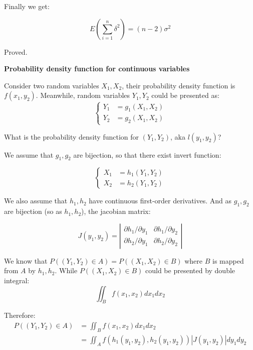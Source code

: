 \documentclass{article}
\begin{document}
Finally we get:

\begin{equation}
E(\sum_{i=1}^n\delta^2)=(n-2)\sigma^2
\end{equation}

Proved.

\textbf{Probability density function for continuous variables}

Consider two random variables \(X_1, X_2\), their probability density function is \(f(x_1, y_2)\).
Meanwhile, random variables \(Y_1, Y_2\) could be presented as:
\begin{equation} 
\left\{
\begin{split}
Y_1&=g_1(X_1, X_2)\\
Y_2&=g_2(X_1, X_2)
\end{split}
\right.
\end{equation}

What is the probability density function for \((Y_1, Y_2)\), aka \(l(y_1, y_2)\)?

We assume that \(g_1, g_2\) are bijection, so that there exist invert function:

\begin{equation}
\left\{
\begin{split}
    X_1&=h_1(Y_1, Y_2)\\
    X_2&=h_2(Y_1, Y_2)
\end{split}
\right.
\end{equation}

We also assume that \(h_1, h_2\) have continuous first-order derivatives. And as \(g_1, g_2\) are
bijection (so as \(h_1, h_2\)), the jacobian matrix:

\begin{equation}
J(y_1,y_2)=\left|
\begin{array}{ccc}
\partial h_1/\partial y_1 & \partial h_1/\partial y_2 \\
\partial h_2/\partial y_1 & \partial h_2/\partial y_2
\end{array}
\right|
\end{equation}

We know that \(P((Y_1,Y_2)\in A)=P((X_1,X_2)\in B)\) where \(B\) is mapped from \(A\) by \(h_1, h_2\).
While \(P((X_1, X_2)\in B)\) could be presented by double integral:
\begin{equation}
\iint_Bf(x_1, x_2)dx_1dx_2
\end{equation}

Therefore:
\begin{equation}
\begin{split}
P((Y_1,Y_2)\in A)&=\iint_Bf(x_1, x_2)dx_1dx_2\\
&=\iint_Af(h_1(y_1,y_2),h_2(y_1,y_2))|J(y_1,y_2)|dy_1dy_2
\end{split}
\end{equation}
\end{document}
